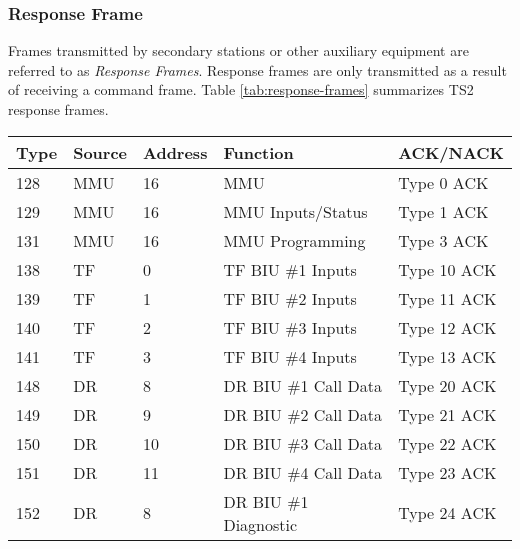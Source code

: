 \documentclass[]{article}
\begin{document}
\clearpage

\subsubsection {Response Frame}
Frames transmitted by secondary stations or other auxiliary equipment are referred to as \textit{Response Frames}. Response frames are only transmitted as a result of receiving a command frame. Table \ref{tab:response-frames} summarizes TS2 response frames.

\begin{table}[ht]
	\footnotesize
	\begin{tabular}{@{}lllll@{}}
		\toprule
		\textbf{Type} & \textbf{Source} & \textbf{Address} & \textbf{Function}              & \textbf{ACK/NACK} \\ \midrule
		128           & MMU             & 16               & MMU                            & Type 0 ACK        \\
		129           & MMU             & 16               & MMU Inputs/Status              & Type 1 ACK        \\
		131           & MMU             & 16               & MMU Programming                & Type 3 ACK        \\
		138           & TF              & 0                & TF BIU \#1 Inputs              & Type 10 ACK       \\
		139           & TF              & 1                & TF BIU \#2 Inputs              & Type 11 ACK       \\
		140           & TF              & 2                & TF BIU \#3 Inputs              & Type 12 ACK       \\
		141           & TF              & 3                & TF BIU \#4 Inputs              & Type 13 ACK       \\
		148           & DR              & 8                & DR BIU \#1 Call Data           & Type 20 ACK       \\
		149           & DR              & 9                & DR BIU \#2 Call Data           & Type 21 ACK       \\
		150           & DR              & 10               & DR BIU \#3 Call Data           & Type 22 ACK       \\
		151           & DR              & 11               & DR BIU \#4 Call Data           & Type 23 ACK       \\
		152           & DR              & 8                & DR BIU \#1 Diagnostic          & Type 24 ACK       \\

\end{tabular}
\end{table}
\end{document}
